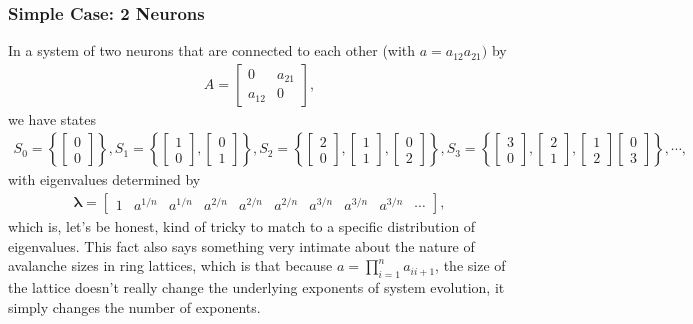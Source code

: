\documentclass[superscriptaddress]{revtex4-1}
\begin{document}
\subsubsection{Simple Case: 2 Neurons}
In a system of two neurons that are connected to each other (with $a = a_{12}a_{21})$ by
\begin{align*}
A = 
\begin{bmatrix}
0      & a_{21}\\
a_{12} & 0
\end{bmatrix},
\end{align*}
we have states
\begin{align*}
S_0 =
\left\{ 
\begin{bmatrix}
0 \\ 0
\end{bmatrix}
\right\},
S_1 =
\left\{ 
\begin{bmatrix}
1 \\ 0
\end{bmatrix},
\begin{bmatrix}
0 \\ 1
\end{bmatrix}
\right\},
S_2 =
\left\{ 
\begin{bmatrix}
2 \\ 0
\end{bmatrix},
\begin{bmatrix}
1 \\ 1
\end{bmatrix},
\begin{bmatrix}
0 \\ 2
\end{bmatrix}
\right\},
S_3 =
\left\{ 
\begin{bmatrix}
3 \\ 0
\end{bmatrix},
\begin{bmatrix}
2 \\ 1
\end{bmatrix},
\begin{bmatrix}
1 \\ 2
\end{bmatrix}
\begin{bmatrix}
0 \\ 3
\end{bmatrix}
\right\},
\dotsm,
\end{align*}
with eigenvalues determined by
\begin{align*}
\bm{\lambda} = 
\begin{bmatrix}
1 & a^{1/n} & a^{1/n} & a^{2/n} & a^{2/n} & a^{2/n} & a^{3/n} & a^{3/n} & a^{3/n} & \dotsm
\end{bmatrix},
\end{align*}
which is, let's be honest, kind of tricky to match to a specific distribution of eigenvalues. This fact also says something very intimate about the nature of avalanche sizes in ring lattices, which is that because $a = \prod_{i=1}^n a_{i i+1}$, the size of the lattice doesn't really change the underlying exponents of system evolution, it simply changes the number of exponents.
\end{document}
